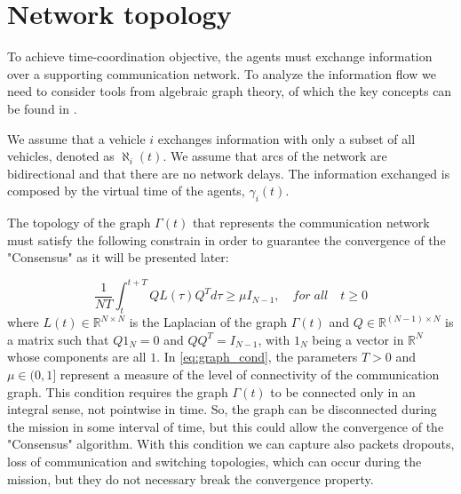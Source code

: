 \section{Network topology\label{sec:network_topology}}

To achieve time-coordination objective, the agents must exchange information
over a supporting communication network.
To analyze the information flow we need to consider tools from algebraic graph
theory, of which the key concepts can be found in \cite{graphBook}.

We assume that a vehicle $i$ exchanges information with only a subset of all
vehicles, denoted as $\aleph_i(t)$.
We assume that arcs of the network are bidirectional and that there are no
network delays.
The information exchanged is composed by the virtual time of the agents,
$\gamma_i(t)$.

The topology of the graph $\Gamma(t)$ that represents the communication network
must satisfy the following constrain in order to guarantee the convergence
of the "Consensus" as it will be presented later:

\begin{equation}  \label{eq:graph_cond}
  \frac{1}{NT} \int_t^{t+T} Q L (\tau) Q^T d \tau \ge \mu I_{N-1}, \quad for \; all \quad t \ge 0
\end{equation}
where $L(t) \in \mathbb{R}^{N \times N}$ is the Laplacian of the graph $\Gamma(t)$
and $Q \in \mathbb{R}^{(N-1) \times N}$ is a matrix such that $Q 1_N = 0$ and
$QQ^T = I_{N-1}$, with $1_N$ being a vector in $\mathbb{R}^N$ whose components
are all $1$.
In \eqref{eq:graph_cond}, the parameters $T > 0$ and $\mu \in (0,1]$ represent
a measure of the level of connectivity of the communication graph.
This condition requires the graph $\Gamma(t)$ to be connected only in an integral
sense, not pointwise in time. So, the graph can be disconnected during
the mission in some interval of time, but this could allow the convergence
of the "Consensus" algorithm.
With this condition we can capture also packets dropouts, loss of communication and
switching topologies, which can occur during the mission, but they do not necessary
break the convergence property.
